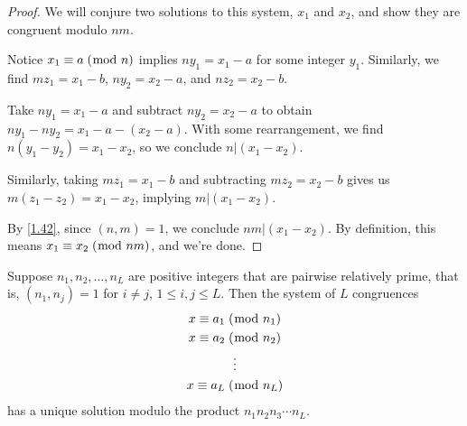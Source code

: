 \documentclass[../main.tex]{subfiles}
\begin{document}
\begin{proof}
  We will conjure two solutions to this system, $x_1$ and $x_2$, and show they are congruent modulo $nm$.

  Notice $x_1 \equiv a \; (\bmod \; n)$ implies $ny_1 = x_1 - a$ for some integer $y_1$. Similarly, we find $mz_1 = x_1 - b$, $ny_2 = x_2 - a$, and $nz_2 = x_2 - b$.

  Take $ny_1 = x_1 - a$ and subtract $ny_2 = x_2 - a$ to obtain $ny_1 - ny_2 = x_1 - a - (x_2 - a)$. With some rearrangement, we find $n(y_1 - y_2) = x_1 - x_2$, so we conclude $n | (x_1 - x_2)$.

  Similarly, taking $mz_1 = x_1 - b$ and subtracting $mz_2 = x_2 - b$ gives us $m(z_1 - z_2) = x_1 - x_2$, implying $m | (x_1 - x_2)$.

  By \ref{1.42}, since $(n, m) = 1$, we conclude $nm | (x_1 - x_2)$. By definition, this means $x_1 \equiv x_2 \; (\bmod \; nm)$, and we're done.
\end{proof}



\begin{thm} \label{3.29}
  Suppose $n_1, n_2, \ldots, n_L$ are positive integers that are pairwise relatively prime, that is, $(n_1, n_j) = 1$ for $i \neq j$, $1 \leq i, j \leq L$. Then the system of $L$ congruences
  \begin{gather*}
    x \equiv a_1 \; (\bmod \; n_1) \\
    x \equiv a_2 \; (\bmod \; n_2) \\
    \vdots \\
    x \equiv a_L \; (\bmod \; n_L)
  \end{gather*}
  has a unique solution modulo the product $n_1n_2n_3\cdots n_L$.
\end{thm}
\end{document}
